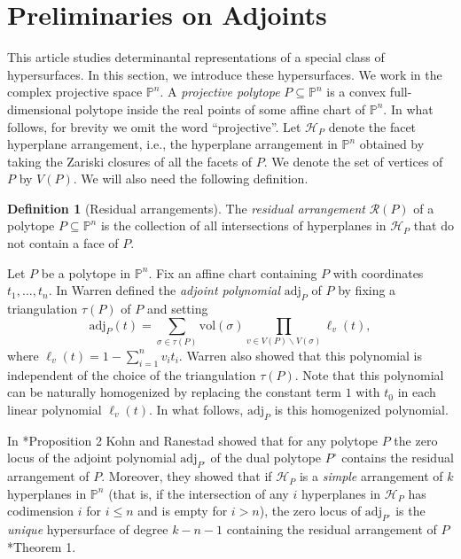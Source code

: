 \documentclass[a4paper,10pt]{amsart}
\theoremstyle{definition}
\newtheorem{Def}{Definition}[section]
\theoremstyle{plain}
\newcommand{\cR}{{\mathcal R}}
\begin{document}
\section{Preliminaries on Adjoints} \label{sec:2}
This article studies determinantal representations of a special class of hypersurfaces. In this section, we introduce these hypersurfaces.
We work in the complex projective space $\mathbb{P}^n$. A \emph{projective polytope} $P\subseteq \mathbb{P}^n$ is a convex full-dimensional polytope inside the real points of some affine chart of $\mathbb{P}^n$. In what follows, for brevity we omit the word ``projective''. Let $\mathcal{H}_P$ denote the facet hyperplane arrangement, i.e., the hyperplane arrangement in $\mathbb{P}^n$ obtained by taking the Zariski closures of all the facets of $P$. We denote the set of vertices of $P$ by $V(P)$. We will also need the following definition. 

\begin{Def}[Residual arrangements]
    The \emph{residual arrangement} $\cR(P)$ of a polytope $P\subseteq \mathbb{P}^n$ is the collection of all intersections of hyperplanes in $\mathcal{H}_P$ that do not contain a face of $P$.
\end{Def}

Let $P$ be a polytope in $\mathbb{P}^n$. Fix an affine chart containing $P$ with coordinates $t_1,\ldots,t_n$. In \cite{warren1996barycentric} Warren defined the \emph{adjoint polynomial} $\mathrm{adj}_P$ of $P$ by fixing a triangulation $\tau(P)$ of $P$ and setting
$$\mathrm{adj}_P(t) = \sum\limits_{\sigma\in\tau(P)}\mathrm{vol}(\sigma)\prod\limits_{v\in V(P)\smallsetminus V(\sigma)}\ell_v(t),$$
where $\ell_v(t) = 1-\sum\limits_{i=1}^n v_it_i$. Warren also showed that this polynomial is independent of the choice of the triangulation $\tau(P)$. Note that this polynomial can be naturally homogenized by replacing the constant term $1$ with $t_0$ in each linear polynomial $\ell_v(t)$. In what follows, $\mathrm{adj}_P$ is this homogenized polynomial.  

In \cite{KohnRanestad2019AdjCurves}*{Proposition 2} Kohn and Ranestad showed that for any polytope $P$ the zero locus of the adjoint polynomial $\mathrm{adj}_{P^\circ}$ of the dual polytope $P^\circ$ contains the residual arrangement of $P$. Moreover, they showed that if $\mathcal{H}_P$ is a \emph{simple} arrangement of $k$ hyperplanes in $\mathbb{P}^n$ (that is, if the intersection of any $i$ hyperplanes in $\mathcal{H}_P$ has codimension $i$ for $i\leq n$ and is empty for $i>n$), the zero locus of $\mathrm{adj}_{P^\circ}$ is the \emph{unique} hypersurface of degree $k-n-1$ containing the residual arrangement of $P$ \cite{KohnRanestad2019AdjCurves}*{Theorem 1}.
\end{document}
